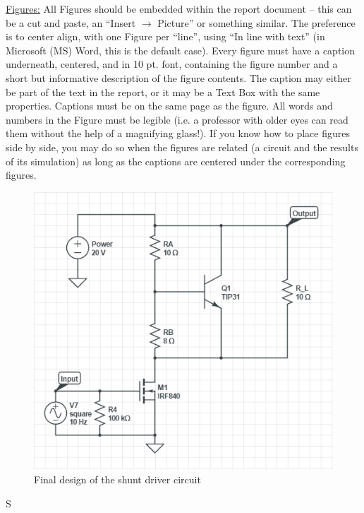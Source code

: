 \documentclass[11pt]{ECEtemp}
\begin{document}
\underline{Figures:} All Figures should be embedded within the report document – this can be a cut and paste, an “Insert $\rightarrow$ Picture” or something similar. The preference is to center align, with one Figure per “line”, using “In line with text” (in Microsoft (MS) Word, this is the default case).  Every figure must have a caption underneath, centered, and in 10 pt. font, containing the figure number and a short but informative description of the figure contents. The caption may either be part of the text in the report, or it may be a Text Box with the same properties. Captions must be on the same page as the figure.  All words and numbers in the Figure must be legible (i.e. a professor with older eyes can read them without the help of a magnifying glass!).
If you know how to place figures side by side, you may do so when the figures are related (a circuit and the results of its simulation) as long as the captions are centered under the corresponding figures. 

	\begin{figure}[!htb]
		\centering
		\includegraphics[scale=1]{img/figure_1}
		\caption{Final design of the shunt driver circuit}
		\label{fig_figure_1}
	\end{figure}S

\newpage

\begin{center}

\end{center}



\end{document}
